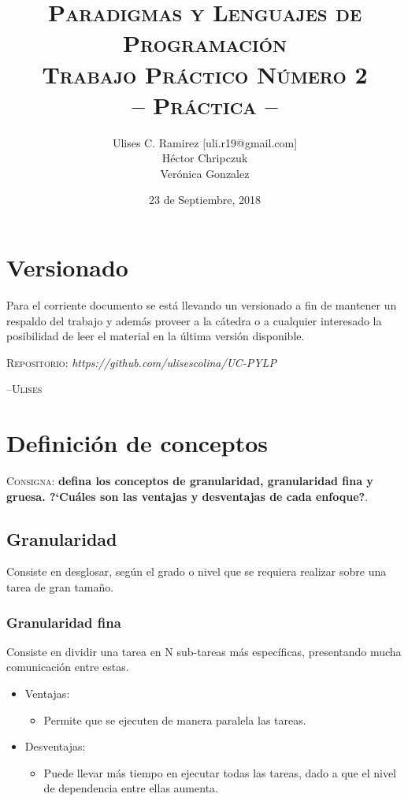 \documentclass{article}
\title{\textsc{Paradigmas y Lenguajes de Programaci\'on\\Trabajo Pr\'actico N\'umero 2\\-- Pr\'actica --}}
\author{Ulises C. Ramirez [uli.r19@gmail.com]\\H\'ector Chripczuk\\Ver\'onica Gonzalez}
\date{23 de Septiembre, 2018}
\begin{document}
\maketitle
{}
\newpage
\section*{Versionado}
Para el corriente documento se est\'a llevando un versionado a fin de mantener un respaldo del trabajo y adem\'as proveer a la c\'atedra o a cualquier interesado la posibilidad de leer el material en la \'ultima versi\'on disponible.\\

\begin{center}
  \textsc{Repositorio}: \textit{https://github.com/ulisescolina/UC-PYLP}
\end{center}


\hfill--\textsc{Ulises}\tableofcontents
{}
\newpage

\section{Definici\'on de conceptos}
\textsc{Consigna}: \textbf{defina los conceptos de granularidad, granularidad
fina y gruesa. ?`Cu\'ales son las ventajas y desventajas de cada enfoque?}.\\

\subsection{Granularidad}
Consiste en desglosar, según el grado o nivel que se requiera realizar sobre una tarea de gran tamaño.

\subsubsection{Granularidad fina}
Consiste en dividir una tarea en N sub-tareas más específicas, presentando
mucha comunicación entre estas.
\begin{itemize}
\item Ventajas:
	\begin{itemize}
	\item Permite que se ejecuten de manera paralela las tareas.
	\end{itemize}
\item Desventajas:
	\begin{itemize}
	\item Puede llevar más tiempo en ejecutar todas las tareas,
dado a que el nivel de dependencia entre ellas aumenta.
	\end{itemize}
\end{itemize}
\end{document}
